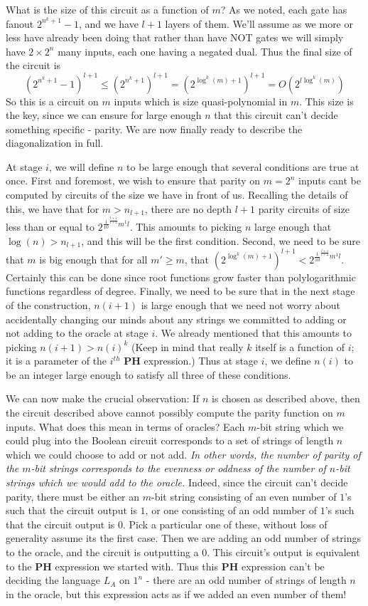 \documentclass{article}
\theoremstyle{definition}
\theoremstyle{plain}
\theoremstyle{theorem}
\begin{document}
What is the size of this circuit as a function of $m$? As we noted, each gate has fanout $2^{n^k+1}-1$, and we have $l+1$ layers of them. We'll assume as we more or less have already been doing that rather than have NOT gates we will simply have $2\times 2^n$ many inputs, each one having a negated dual. Thus the final size of the circuit is
\[ (2^{n^k+1}-1)^{l+1} \leq (2^{n^k+1})^{l+1} = (2^{\log^k(m)+1})^{l+1} = O(2^{l\log^k(m)}) \]
So this is a circuit on $m$ inputs which is size quasi-polynomial in $m$. This size is the key, since we can ensure for large enough $n$ that this circuit can't decide something specific - parity. We are now finally ready to describe the diagonalization in full. \par 
At stage $i$, we will define $n$ to be large enough that several conditions are true at once. First and foremost, we wish to ensure that parity on $m=2^n$ inputs cant be computed by circuits of the size we have in front of us. Recalling the details of this, we have that for $m > n_{l+1}$, there are no depth $l+1$ parity circuits of size less than or equal to $2^{\frac{1}{10}^{\frac{l+1}{l+2}}m^{1}{l}}$. This amounts to picking $n$ large enough that $\log(n) > n_{l+1}$, and this will be the first condition. Second, we need to be sure that $m$ is big enough that for all $m' \geq m$, that  $(2^{\log^k(m)+1})^{l+1} < 2^{\frac{1}{10}^{\frac{l+1}{l+2}}m^{1}{l}}$. Certainly this can be done since root functions grow faster than polylogarithmic functions regardless of degree. Finally, we need to be sure that in the next stage of the construction, $n(i+1)$ is large enough that we need not worry about accidentally changing our minds about any strings we committed to adding or not adding to the oracle at stage $i$. We already mentioned that this amounts to picking $n(i+1) > n(i)^k$ (Keep in mind that really $k$ itself is a function of $i$; it is a parameter of the $i^{th}$ $\bm{PH}$ expression.) Thus at stage $i$, we define $n(i)$ to be an integer large enough to satisfy all three of these conditions. \par 
We can now make the crucial observation: If $n$ is chosen as described above, then the circuit described above cannot possibly compute the parity function on $m$ inputs. What does this mean in terms of oracles? Each $m$-bit string which we could plug into the Boolean circuit corresponds to a set of strings of length $n$ which we could choose to add or not add. \emph{In other words, the number of parity of the $m$-bit strings corresponds to the evenness or oddness of the number of $n$-bit strings which we would add to the oracle.} Indeed, since the circuit can't decide parity, there must be either an $m$-bit string consisting of an even number of $1$'s such that the circuit output is $1$, or one consisting of an odd number of $1$'s such that the circuit output is $0$. Pick a particular one of these, without loss of generality assume its the first case. Then we are adding an odd number of strings to the oracle, and the circuit is outputting a $0$. This circuit's output is equivalent to the $\bm{PH}$ expression we started with. Thus this $\bm{PH}$ expression can't be deciding the language $L_A$ on $1^n$ - there are an odd number of strings of length $n$ in the oracle, but this expression acts as if we added an even number of them! \par 
\end{document}
